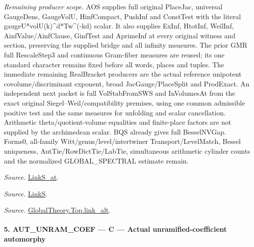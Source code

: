 \documentclass[11pt,a4paper]{article}
\numberwithin{equation}{section}
\theoremstyle{remark}\newtheorem{remark}[theorem]{Remark}
\begin{document}
\emph{Remaining producer scope.} AOS supplies full original PlaceJac, universal GaugeDens, GaugeVolU, HinfCompact, PushInf and ConstTest with the literal gaugeU*volU(k)\textasciicircum{}d*Tw\textasciicircum{}(-kd) scalar. It also supplies ExInf, HtotInf, WeilInf, AinfValue/AinfClause, GinfTest and AprimeInf at every original witness and section, preserving the supplied bridge and all infinity measures. The prior GMR full RescaleStep3 and continuous Gram-fiber measures are reused; its one standard character remains fixed before all words, places and tuples. The immediate remaining RealBracket producers are the actual reference unipotent covolume/discriminant exponent, broad JacGauge/PlaceSplit and ProdExact. An independent next packet is full VolStabFromSWS and InVolumesAt from the exact original Siegel–Weil/compatibility premises, using one common admissible positive test and the same measures for unfolding and scalar cancellation. Arithmetic theta/quotient-volume equalities and finite-place factors are not supplied by the archimedean scalar. BQS already gives full BesselNVGap. Forms0, all-family Witt/genus/level/intertwiner Transport/LevelMatch, Bessel uniqueness, AutTie/RowDictTie/LabTie, simultaneous arithmetic cylinder counts and the normalized GLOBAL\_\allowbreak SPECTRAL estimate remain.

\emph{Source.} \href{https://github.com/CocoSgt/riemann-hypothesis-lean/blob/7cbf7a0c32fca1badf05931879a37c3f8a2b03b4/src/Formalism/SharpRestriction/GlobalTheoremInputs.lean#L145-L149}{LinkS\_\allowbreak at}.

\emph{Source.} \href{https://github.com/CocoSgt/riemann-hypothesis-lean/blob/7cbf7a0c32fca1badf05931879a37c3f8a2b03b4/src/Formalism/SharpRestriction/GlobalTheoremInputs.lean#L152-L157}{LinkS}.

\emph{Source.} \href{https://github.com/CocoSgt/riemann-hypothesis-lean/blob/7cbf7a0c32fca1badf05931879a37c3f8a2b03b4/src/Development/AbelianVarietyTheory/Proofs/GlobalInterpolation/LinkAlt.lean#L16-L50}{GlobalTheory.Top.link\_\allowbreak alt}.



\paragraph{5. AUT\_\allowbreak UNRAM\_\allowbreak COEF — C — Actual unramified-coefficient automorphy}
\end{document}
